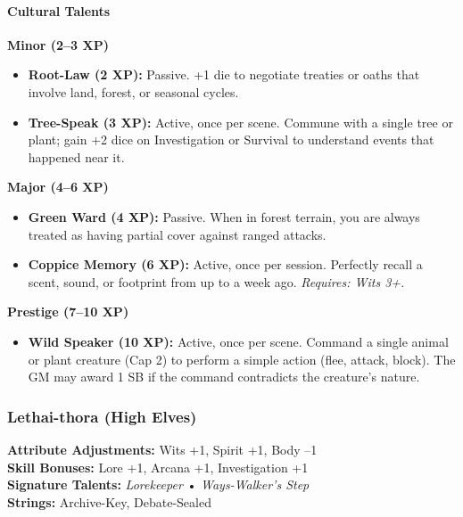 \paragraph{Cultural Talents}

\textbf{Minor (2--3 XP)}
\begin{itemize}
  \item \textbf{Root-Law (2 XP):} Passive. +1 die to negotiate treaties or oaths that involve land, forest, or seasonal cycles.
  \item \textbf{Tree-Speak (3 XP):} Active, once per scene. Commune with a single tree or plant; gain +2 dice on Investigation or Survival to understand events that happened near it.
\end{itemize}

\textbf{Major (4--6 XP)}
\begin{itemize}
  \item \textbf{Green Ward (4 XP):} Passive. When in forest terrain, you are always treated as having partial cover against ranged attacks.
  \item \textbf{Coppice Memory (6 XP):} Active, once per session. Perfectly recall a scent, sound, or footprint from up to a week ago. \textit{Requires: Wits 3+.}
\end{itemize}

\textbf{Prestige (7--10 XP)}
\begin{itemize}
  \item \textbf{Wild Speaker (10 XP):} Active, once per scene. Command a single animal or plant creature (Cap 2) to perform a simple action (flee, attack, block). The GM may award 1 SB if the command contradicts the creature's nature.
\end{itemize}

\subsubsection{Lethai-thora (High Elves)}
\label{subsec:lethai-thora-detailed}

\begin{tcolorbox}[colback=black!3!white,colframe=black!40!white,title=High Elf at a Glance,breakable]
\textbf{Attribute Adjustments:} Wits +1, Spirit +1, Body --1 \\
\textbf{Skill Bonuses:} Lore +1, Arcana +1, Investigation +1 \\
\textbf{Signature Talents:} \emph{Lorekeeper} • \emph{Ways-Walker's Step} \\
\textbf{Strings:} Archive-Key, Debate-Sealed
\end{tcolorbox}

